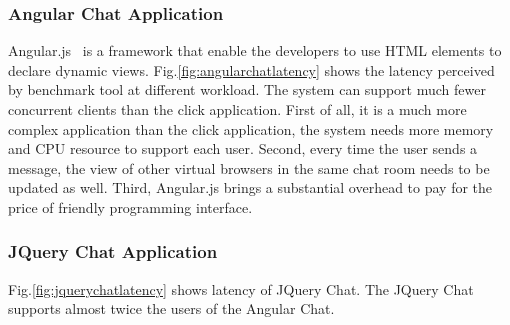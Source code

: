 
\appinstancefig{}



\subsubsection{Angular Chat Application}
\label{sec:angular}
Angular.js~\cite{angular} is a \js{} framework that enable the developers to 
use HTML elements to declare dynamic views.
Fig.\ref{fig:angularchatlatency} shows the latency perceived by benchmark tool
at different workload.
The system can support much fewer concurrent clients than the click application.
First of all, it is a much more complex application than the click application,
the system needs more memory and CPU resource to support each user.
Second, every time the user sends a message, the view of other virtual browsers
in the same chat room needs to be updated as well.
Third, Angular.js brings a substantial overhead 
to pay for the price of friendly programming interface.

\angularchatlatency{}

\subsubsection{JQuery Chat Application}
\label{sec:jquery}
Fig.\ref{fig:jquerychatlatency} shows latency of JQuery Chat.
The JQuery Chat supports almost twice the users of the Angular Chat.

\jquerychatlatency{}